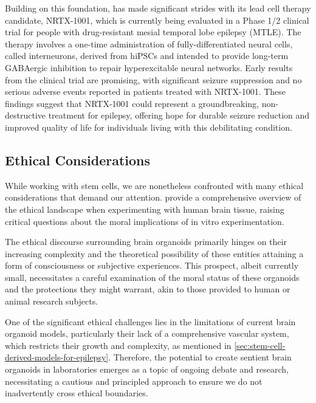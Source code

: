 \documentclass[10pt]{article}
\begin{document}
\begin{sloppypar}
  Building on this foundation, \citeauthor{neurona_neurona_2022} \citeyearpar{neurona_neurona_2022} has made significant strides with its lead cell therapy candidate, NRTX-1001, which is currently being evaluated in a Phase 1/2 clinical trial for people with drug-resistant mesial temporal lobe epilepsy (MTLE). The therapy involves a one-time administration of fully-differentiated neural cells, called interneurons, derived from hiPSCs and intended to provide long-term GABAergic inhibition to repair hyperexcitable neural networks. Early results from the clinical trial are promising, with significant seizure suppression and no serious adverse events reported in patients treated with NRTX-1001. These findings suggest that NRTX-1001 could represent a groundbreaking, non-destructive treatment for epilepsy, offering hope for durable seizure reduction and improved quality of life for individuals living with this debilitating condition.

  \subsection{Ethical Considerations}
  \label{sec:ethical-considerations}

  While working with stem cells, we are nonetheless confronted with many ethical considerations that demand our attention. \citeauthor{farahany_ethics_2018} \citeyearpar{farahany_ethics_2018} provide a comprehensive overview of the ethical landscape when experimenting with human brain tissue, raising critical questions about the moral implications of in vitro experimentation.

  The ethical discourse surrounding brain organoids primarily hinges on their increasing complexity and the theoretical possibility of these entities attaining a form of consciousness or subjective experiences. This prospect, albeit currently small, necessitates a careful examination of the moral status of these organoids and the protections they might warrant, akin to those provided to human or animal research subjects.

  One of the significant ethical challenges lies in the limitations of current brain organoid models, particularly their lack of a comprehensive vascular system, which restricts their growth and complexity, as mentioned in \autoref{sec:stem-cell-derived-models-for-epilepsy}. Therefore, the potential to create sentient brain organoids in laboratories emerges as a topic of ongoing debate and research, necessitating a cautious and principled approach to ensure we do not inadvertently cross ethical boundaries.


\end{sloppypar}
\end{document}

